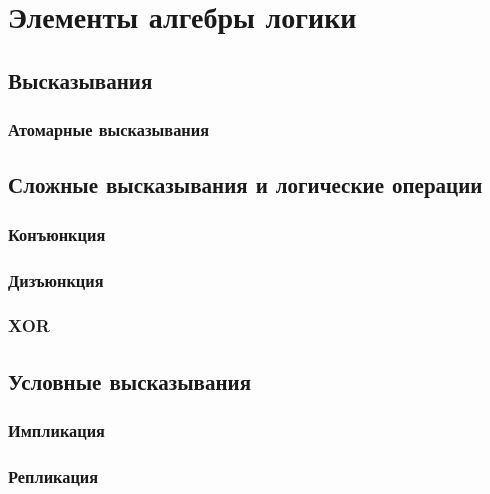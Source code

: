 \documentclass[
  letterpaper,
]{scrbook}
\theoremstyle{definition}
\theoremstyle{remark}
\begin{document}

\chapter{Элементы алгебры логики}\label{math-logic}

\section{Высказывания}\label{math-logic-utterance}

\subsection{Атомарные высказывания}\label{math-logic-utterance-atomic}

\section{Сложные высказывания и логические
операции}\label{math-logic-orepation}

\subsection{Конъюнкция}\label{math-logic-orepation-and}

\subsection{Дизъюнкция}\label{math-logic-orepation-or}

\subsection{XOR}\label{math-logic-orepation-xor}

\section{Условные высказывания}\label{math-logic-conditions}

\subsection{Импликация}\label{math-logic-conditions-implication}

\subsection{Репликация}\label{math-logic-conditions-replication}
\end{document}

